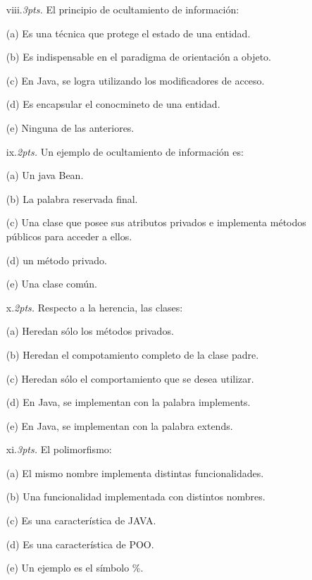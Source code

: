 \documentclass[10pt]{article}
\begin{document}
\begin{enumerate}
{\begin{multicols}{2}
    \begin{enumerate}[label=(\alph*)]
        \item[viii.\emph{3pts.}] El principio de ocultamiento de informaci\'on:
        \item[(a)] Es una t\'ecnica que protege el estado de una entidad.
        \item[(b)] Es indispensable en el paradigma de orientaci\'on a objeto.
        \item[(c)] En Java, se logra utilizando los modificadores de acceso.
        \item[(d)] Es encapsular el conocmineto de una entidad.
        \item[(e)] Ninguna de las anteriores.
    \end{enumerate}

    \begin{enumerate}[label=(\alph*)]
        \item[ix.\emph{2pts.}] Un ejemplo de ocultamiento de informaci\'on es:
        \item[(a)] Un java Bean.
        \item[(b)] La palabra reservada final.
        \item[(c)] Una clase que posee sus atributos privados e implementa m\'etodos p\'ublicos para acceder a ellos.
        \item[(d)] un m\'etodo privado.
        \item[(e)] Una clase com\'un.
    \end{enumerate}

    \begin{enumerate}[label=(\alph*)]
        \item[x.\emph{2pts.}] Respecto a la herencia, las clases:
        \item[(a)] Heredan s\'olo los m\'etodos privados.
        \item[(b)] Heredan el compotamiento completo de la clase padre.
        \item[(c)] Heredan s\'olo el comportamiento que se desea utilizar.
        \item[(d)] En Java, se implementan con la palabra implements.
        \item[(e)] En Java, se implementan con la palabra extends.
    \end{enumerate}

    \begin{enumerate}[label=(\alph*)]
        \item[xi.\emph{3pts.}] El polimorfismo:
        \item[(a)] El mismo nombre implementa distintas funcionalidades.
        \item[(b)] Una funcionalidad implementada con distintos nombres.
        \item[(c)] Es una caracter\'istica de JAVA.
        \item[(d)] Es una caracter\'istica de POO.
        \item[(e)] Un ejemplo es el s\'imbolo \%.
    \end{enumerate}


\end{multicols}}
\end{enumerate}
\end{document}
